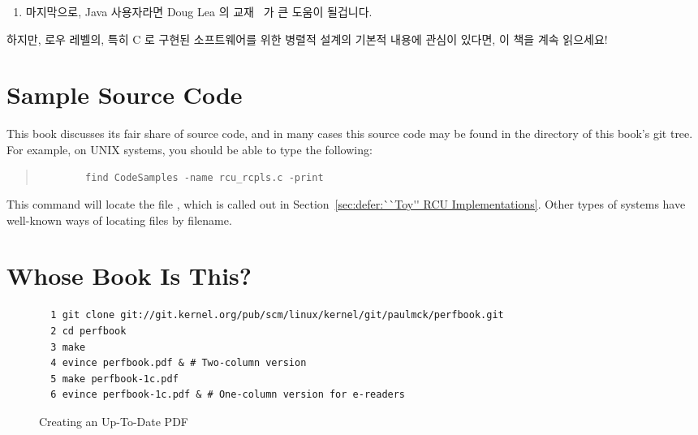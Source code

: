 \begin{enumerate}

\item	마지막으로, Java 사용자라면 Doug Lea 의
	교재~\cite{DougLea1997Textbook,Goetz2007Textbook} 가 큰 도움이
	될겁니다.


\end{enumerate}

하지만, 로우 레벨의, 특히 C 로 구현된 소프트웨어를 위한 병렬적 설계의 기본적
내용에 관심이 있다면, 이 책을 계속 읽으세요!


\section{Sample Source Code}
\label{sec:howto:Sample Source Code}

This book discusses its fair share of source code, and in many cases
this source code may be found in the  directory
of this book's git tree.
For example, on UNIX systems, you should be able to type the following:

\begin{quote}
	{\scriptsize
	\begin{verbatim}
		find CodeSamples -name rcu_rcpls.c -print
	\end{verbatim}
	}
\end{quote}

This command will locate the file , which is called out in
Section~\ref{sec:defer:``Toy'' RCU Implementations}.
Other types of systems have well-known ways of locating files by filename.

\section{Whose Book Is This?}
\label{sec:howto:Whose Book Is This?}

\begin{figure*}[tbp]
{
\scriptsize
\begin{verbatim}
  1 git clone git://git.kernel.org/pub/scm/linux/kernel/git/paulmck/perfbook.git
  2 cd perfbook
  3 make
  4 evince perfbook.pdf & # Two-column version
  5 make perfbook-1c.pdf
  6 evince perfbook-1c.pdf & # One-column version for e-readers
\end{verbatim}
}
\caption{Creating an Up-To-Date PDF}
\label{fig:howto:Creating a Up-To-Date PDF}
\end{figure*}

